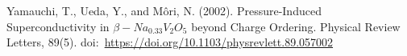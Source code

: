 \documentclass[11pt]{article}
\begin{document}
\begin{thebibliography}{3}
                                                                                                                                                                                                                                                                                                                                                                                                                                                                                                                                                                                                                                                                                                                                                                                                                                                                                                                                                                                                                                                                                                                                                                                                                                                                                                                                                                                                                                                                                                                                                                                                                                                                                                                                                                                                                                                                                                                                                                                                                                                                                                                                                                                                                                                                                                                                                                                                                                                                                                           

Yamauchi, T., Ueda, Y., and Môri, N. (2002). Pressure-Induced Superconductivity in $\beta−Na_{0.33}V_2O_5$ beyond Charge Ordering. Physical Review Letters, 89(5). doi:~\url{https://doi.org/10.1103/physrevlett.89.057002} 


\end{thebibliography}
\end{document}
